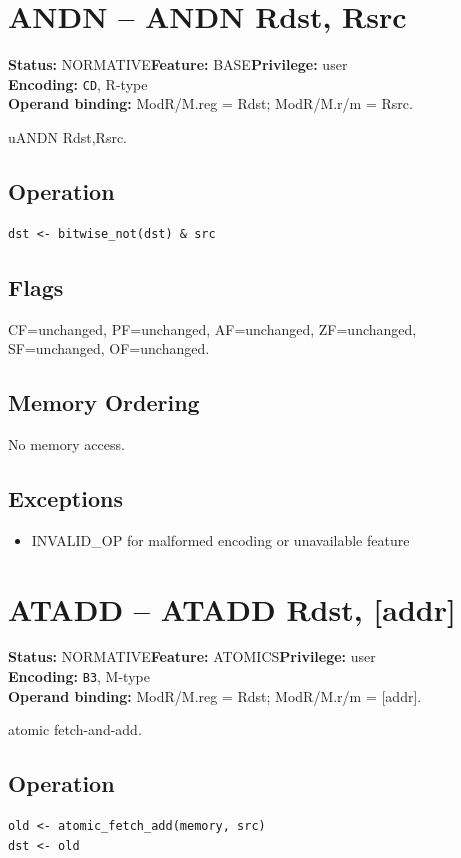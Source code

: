 \documentclass[10pt]{article}
\begin{document}
\section{ANDN -- ANDN Rdst, Rsrc}
\textbf{Status:} NORMATIVE\quad \textbf{Feature:} BASE\quad \textbf{Privilege:} user\\
\textbf{Encoding:} \texttt{CD}, R-type\\
\textbf{Operand binding:} ModR/M.reg = Rdst; ModR/M.r/m = Rsrc.

uANDN Rdst,Rsrc.

\subsection*{Operation}
\begin{lstlisting}
dst <- bitwise_not(dst) & src
\end{lstlisting}
\subsection*{Flags}
CF=unchanged, PF=unchanged, AF=unchanged, ZF=unchanged, SF=unchanged, OF=unchanged.
\subsection*{Memory Ordering}
No memory access.
\subsection*{Exceptions}
\begin{itemize}
\item INVALID\_OP for malformed encoding or unavailable feature
\end{itemize}
\clearpage

\section{ATADD -- ATADD Rdst, [addr]}
\textbf{Status:} NORMATIVE\quad \textbf{Feature:} ATOMICS\quad \textbf{Privilege:} user\\
\textbf{Encoding:} \texttt{B3}, M-type\\
\textbf{Operand binding:} ModR/M.reg = Rdst; ModR/M.r/m = [addr].

atomic fetch-and-add.

\subsection*{Operation}
\begin{lstlisting}
old <- atomic_fetch_add(memory, src)
dst <- old
\end{lstlisting}
\end{document}

